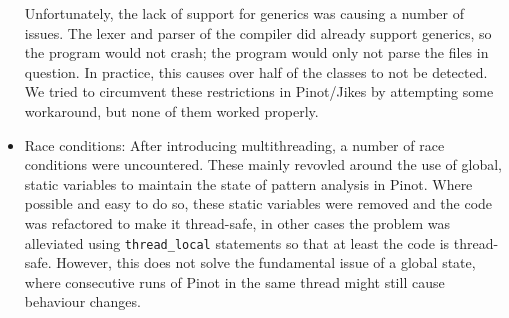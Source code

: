 \begin{itemize}
    Unfortunately, the lack of support for generics was causing a number of issues. The lexer and parser of the compiler did already support generics, so the program would not crash; the program would only not parse the files in question. In practice, this causes over half of the classes to not be detected. We tried to circumvent these restrictions in Pinot/Jikes by attempting some workaround, but none of them worked properly.
    
    \item Race conditions: After introducing multithreading, a number of race conditions were uncountered. These mainly revovled around the use of global, static variables to maintain the state of pattern analysis in Pinot. Where possible and easy to do so, these static variables were removed and the code was refactored to make it thread-safe, in other cases the problem was alleviated using {\tt thread\_local} statements so that at least the code is thread-safe. However, this does not solve the fundamental issue of a global state, where consecutive runs of Pinot in the same thread might still cause behaviour changes.
\end{itemize}